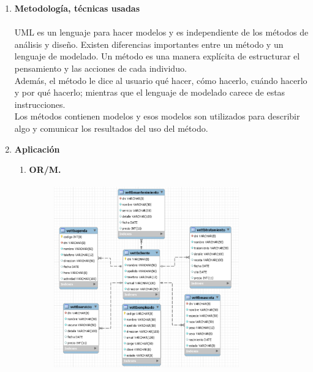 \documentclass[12pt,a4paper,oneside]{book}
\begin{document}
\begin{enumerate}
\begin{enumerate}
\begin{itemize}
					\end{itemize}
					
				
				\item \textbf{Metodolog\'ia, t\'ecnicas usadas}\\  \\
						UML es un lenguaje para hacer modelos y es independiente de los métodos de análisis y diseño. Existen diferencias importantes entre un método y un lenguaje de modelado. Un método es una manera explícita de estructurar el pensamiento y las acciones de cada individuo. \\
						
						Además, el método le dice al usuario qué hacer, cómo hacerlo, cuándo hacerlo y por qué hacerlo; mientras que el lenguaje de modelado carece de estas instrucciones. \\ 
						
						Los métodos contienen modelos y esos modelos son utilizados para describir algo y comunicar los resultados del uso del método. \\
		\newpage
				\item \textbf{Aplicaci\'on}  \\
					
					\begin{enumerate}
						\item \textbf{OR/M.}
						
							\begin{figure}[htb]
									\centering \includegraphics[width=8cm, height=8cm]{img/OR/mapa.png}
							\end{figure}
							

\end{enumerate}
\end{enumerate}
\end{enumerate}
\end{document}
